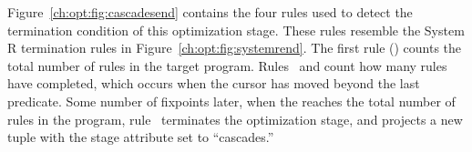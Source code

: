 Figure~\ref{ch:opt:fig:cascadesend} contains the four rules used to detect the
termination condition of this optimization stage.  These rules resemble the
System R termination rules in Figure~\ref{ch:opt:fig:systemrend}.  The first
rule () counts the total number of rules in the target program.
Rules~ and  count how many rules have completed, which occurs
when the  cursor has moved beyond the last predicate.  Some number
of fixpoints later, when the  reaches the total number of
rules in the program, rule~ terminates the optimization stage, and
projects a new  tuple with the stage attribute set to
``cascades.''


%
%
%
